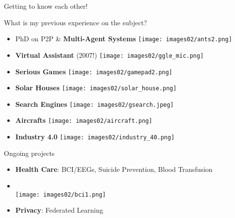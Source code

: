 \documentclass[English,t,%
hyperref={%
    pdftitle={GM's Introduction},%
    pdfauthor={Guillaume Muller},%
    pdfsubject={GM's Introduction},%
    pdfkeywords={Presentation, Introduction}%
    },%
xcolor={pdftex,svgnames} %
]{beamer}
\begin{document}
\begin{frame}{Getting to know each other!}
  \begin{block}{What is my previous experience on the subject?}
    { \footnotesize
      \begin{itemize}
        \item PhD on P2P \& \textbf{Multi-Agent Systems} \hspace{1cm} \texttt{[image: images02/ants2.png]}\\[-2ex]
      \end{itemize}
      \begin{minipage}[c]{.45\linewidth}
        \begin{itemize}
          \item \textbf{Virtual Assistant} (2007!) \hfill \texttt{[image: images02/ggle\_mic.png]}    %
          \item \textbf{Serious Games}             \hfill \texttt{[image: images02/gamepad2.png]}    %
          \item \textbf{Solar Houses}              \hfill \texttt{[image: images02/solar\_house.png]} %
        \end{itemize}
      \end{minipage}
      \begin{minipage}[c]{.45\linewidth}
        \begin{itemize}
          \item \textbf{Search Engines} \hfill \texttt{[image: images02/gsearch.jpeg]}    %
          \item \textbf{Aircrafts}      \hfill \texttt{[image: images02/aircraft.png]}    %
          \item \textbf{Industry 4.0}   \hfill \texttt{[image: images02/industry\_40.png]} %
        \end{itemize}
      \end{minipage}
    }
  \end{block}

  \begin{block}{Ongoing projects}
    { \footnotesize
      \begin{itemize}
        \item \textbf{Health Care}: BCI/EEGs, Suicide Prevention, Blood Transfusion
        \item[]~\\[-1cm] \hfill \texttt{[image: images02/bci1.png]}
        \item \textbf{Privacy}: Federated Learning
      \end{itemize}
      }
  \end{block}

\end{frame}
\end{document}
